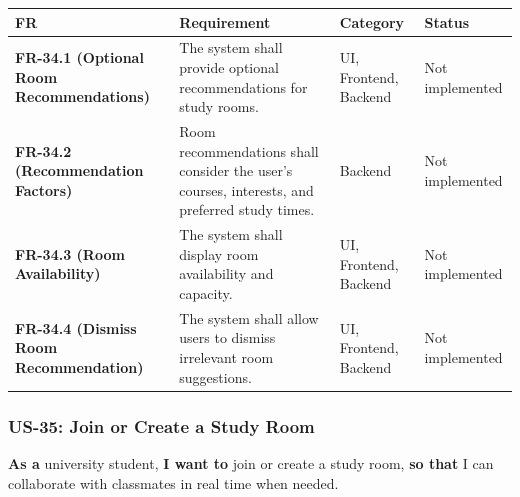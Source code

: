 \documentclass[12pt]{article}
\renewcommand{\baselinestretch}{1.5}
\begin{document}
\begingroup
\small
\renewcommand{\baselinestretch}{1.0}\selectfont
\renewcommand{\arraystretch}{1.15}
\setlength{\tabcolsep}{6pt}
\begin{longtable}{|>{\raggedright\arraybackslash}p{}|>{\raggedright\arraybackslash}p{}|>{\raggedright\arraybackslash}p{}|>{\raggedright\arraybackslash}p{}|}
\hline
\textbf{FR} & \textbf{Requirement} & \textbf{Category} & \textbf{Status} \\ \hline
\endhead
\textbf{FR-34.1 (Optional Room Recommendations)} & The system shall provide optional recommendations for study rooms. & UI, Frontend, Backend & Not implemented \\ \hline
\textbf{FR-34.2 (Recommendation Factors)} & Room recommendations shall consider the user's courses, interests, and preferred study times. & Backend & Not implemented \\ \hline
\textbf{FR-34.3 (Room Availability)} & The system shall display room availability and capacity. & UI, Frontend, Backend & Not implemented \\ \hline
\textbf{FR-34.4 (Dismiss Room Recommendation)} & The system shall allow users to dismiss irrelevant room suggestions. & UI, Frontend, Backend & Not implemented \\ \hline
\end{longtable}
\endgroup
\par\medskip

\hypertarget{sec:us-35-join-or-create-a-study-room}{}
\subsubsection*{US-35: Join or Create a Study Room}
\par\medskip

\textbf{As a} university student, \textbf{I want to} join or create a study room, \textbf{so that} I can collaborate with classmates in real time when needed.
\par\medskip
\end{document}
